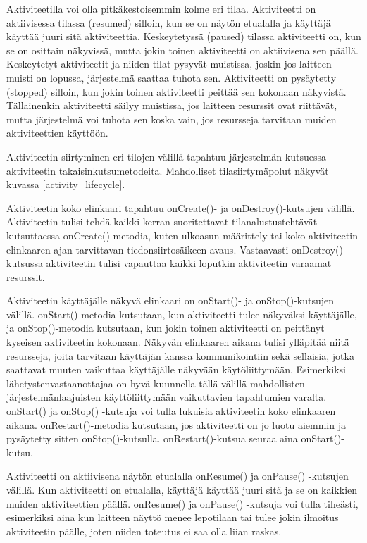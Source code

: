 Aktiviteetilla voi olla pitkäkestoisemmin kolme eri tilaa. Aktiviteetti on aktiivisessa tilassa (resumed) silloin, kun se on näytön etualalla ja käyttäjä käyttää juuri sitä aktiviteettia. Keskeytetyssä (paused) tilassa aktiviteetti on, kun se on osittain näkyvissä, mutta jokin toinen aktiviteetti on aktiivisena sen päällä. Keskeytetyt aktiviteetit ja niiden tilat pysyvät muistissa, joskin jos laitteen muisti on lopussa, järjestelmä saattaa tuhota sen. Aktiviteetti on pysäytetty (stopped) silloin, kun jokin toinen aktiviteetti peittää sen kokonaan näkyvistä. Tällainenkin aktiviteetti säilyy muistissa, jos laitteen resurssit ovat riittävät, mutta järjestelmä voi tuhota sen koska vain, jos resursseja tarvitaan muiden aktiviteettien käyttöön.

Aktiviteetin siirtyminen eri tilojen välillä tapahtuu järjestelmän kutsuessa aktiviteetin takaisinkutsumetodeita. Mahdolliset tilasiirtymäpolut näkyvät kuvassa \ref{activity_lifecycle}. 

Aktiviteetin koko elinkaari tapahtuu onCreate()- ja onDestroy()-kutsujen välillä. Aktiviteetin tulisi tehdä kaikki kerran suoritettavat tilanalustustehtävät kutsuttaessa onCreate()-metodia, kuten ulkoasun määrittely tai koko aktiviteetin elinkaaren ajan tarvittavan tiedonsiirtosäikeen avaus. Vastaavasti onDestroy()-kutsussa aktiviteetin tulisi vapauttaa kaikki loputkin aktiviteetin varaamat resurssit.

Aktiviteetin käyttäjälle näkyvä elinkaari on onStart()- ja onStop()-kutsujen välillä. onStart()-metodia kutsutaan, kun aktiviteetti tulee näkyväksi käyttäjälle, ja onStop()-metodia kutsutaan, kun jokin toinen aktiviteetti on peittänyt kyseisen aktiviteetin kokonaan. Näkyvän elinkaaren aikana tulisi ylläpitää niitä resursseja, joita tarvitaan käyttäjän kanssa kommunikointiin sekä sellaisia, jotka saattavat muuten vaikuttaa käyttäjälle näkyvään käytöliittymään. Esimerkiksi lähetystenvastaanottajaa on hyvä kuunnella tällä välillä mahdollisten järjestelmänlaajuisten käyttöliittymään vaikuttavien tapahtumien varalta. onStart() ja onStop() -kutsuja voi tulla lukuisia aktiviteetin koko elinkaaren aikana. onRestart()-metodia kutsutaan, jos aktiviteetti on jo luotu aiemmin ja pysäytetty sitten onStop()-kutsulla. onRestart()-kutsua seuraa aina onStart()-kutsu.

Aktiviteetti on aktiivisena näytön etualalla onResume() ja onPause() -kutsujen välillä. Kun aktiviteetti on etualalla, käyttäjä käyttää juuri sitä ja se on kaikkien muiden aktiviteettien päällä. onResume() ja onPause() -kutsuja voi tulla tiheästi, esimerkiksi aina kun laitteen näyttö menee lepotilaan tai tulee jokin ilmoitus aktiviteetin päälle, joten niiden toteutus ei saa olla liian raskas.

